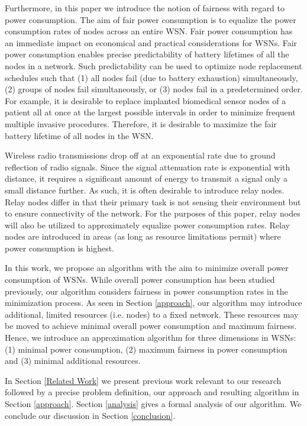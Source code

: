 Furthermore, in this paper we introduce the notion of fairness with regard to power consumption. The aim of fair power consumption is to equalize the power consumption rates of nodes across an entire WSN. Fair power consumption has an immediate impact on economical and practical considerations for WSNs. Fair power consumption enables precise predictability of battery lifetimes of all the nodes in a network. Such predictability can be used to optimize node replacement schedules such that (1) all nodes fail (due to battery exhaustion) simultaneously, (2) groups of nodes fail simultaneously, or (3) nodes fail in a predetermined order. For example, it is desirable to replace implanted biomedical sensor nodes of a patient all at once at the largest possible intervals in order to minimize frequent multiple invasive procedures. Therefore, it is desirable to maximize the fair battery lifetime of all nodes in the WSN.

Wireless radio transmissions drop off at an exponential rate due to ground reflection of radio signals. Since the signal attenuation rate is exponential with distance, it requires a significant amount of energy to transmit a signal only a small distance further. As such, it is often desirable to introduce relay nodes. Relay nodes differ in that their primary task is not sensing their environment but to ensure connectivity of the network. For the purposes of this paper, relay nodes will also be utilized to approximately equalize power consumption rates. Relay nodes are introduced in areas (as long as resource limitations permit) where power consumption is highest.

In this work, we propose an algorithm with the aim to minimize overall power consumption of WSNs. While overall power consumption has been studied previously, our algorithm considers fairness in power consumption rates in the minimization process. As seen in Section \ref{approach}, our algorithm may introduce additional, limited resources (i.e. nodes) to a fixed network. These resources may be moved to achieve minimal overall power consumption and maximum fairness. Hence, we introduce an approximation algorithm for three dimensions in WSNs: (1) minimal power consumption, (2) maximum fairness in power consumption and (3) minimal additional resources.

In Section \ref{Related Work} we present previous work relevant to our research followed by a precise problem definition, our approach and resulting algorithm in Section \ref{approach}. Section \ref{analysis} gives a formal analysis of our algorithm. We conclude our discussion in Section \ref{conclusion}.

